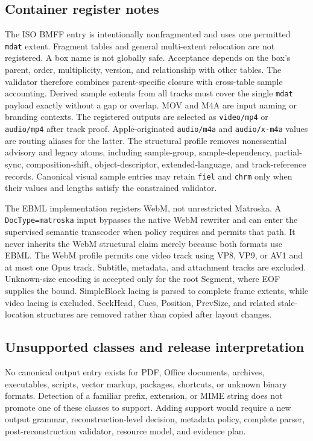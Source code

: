 \subsection{Container register notes}

The ISO BMFF entry is intentionally nonfragmented and uses one permitted
\texttt{mdat} extent.  Fragment tables and general multi-extent relocation are
not registered.  A box name is not globally safe.  Acceptance depends on the
box's parent, order, multiplicity, version, and relationship with other tables.
The validator therefore combines parent-specific closure with cross-table
sample accounting. Derived sample extents from all tracks must cover the single
\texttt{mdat} payload exactly without a gap or overlap. MOV and M4A are input naming or branding contexts. The
registered outputs are selected as \texttt{video/mp4} or \texttt{audio/mp4}
after track proof.  Apple-originated \texttt{audio/m4a} and
\texttt{audio/x-m4a} values are routing aliases for the latter.  The structural
profile removes nonessential advisory and legacy atoms, including sample-group,
sample-dependency, partial-sync, composition-shift, object-descriptor,
extended-language, and track-reference records.  Canonical visual sample
entries may retain \texttt{fiel} and \texttt{chrm} only when their values and
lengths satisfy the constrained validator.

The EBML implementation registers WebM, not unrestricted Matroska.  A
\texttt{DocType=matroska} input bypasses the native WebM rewriter and can enter
the supervised semantic transcoder when policy requires and permits that path.
It never inherits the WebM structural claim merely because both formats use
EBML.  The WebM
profile permits one video track using VP8, VP9, or AV1 and at most one Opus
track.  Subtitle, metadata, and attachment tracks are excluded.  Unknown-size
encoding is accepted only for the root Segment, where EOF supplies the bound.
SimpleBlock lacing is parsed to complete frame extents, while video lacing is
excluded.  SeekHead, Cues, Position, PrevSize, and related stale-location
structures are removed rather than copied after layout changes.

\subsection{Unsupported classes and release interpretation}

No canonical output entry exists for PDF, Office documents, archives,
executables, scripts, vector markup, packages, shortcuts, or unknown binary
formats.  Detection of a familiar prefix, extension, or MIME string does not
promote one of these classes to support.  Adding support would require a new
output grammar, reconstruction-level decision, metadata policy, complete
parser, post-reconstruction validator, resource model, and evidence plan.

